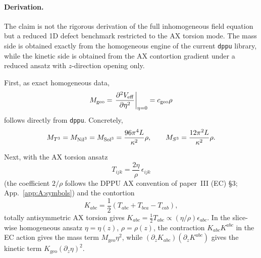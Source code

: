 \paragraph{Derivation.}
The claim is not the rigorous derivation of the full inhomogeneous field
equation but a reduced 1D defect benchmark restricted to the AX torsion mode.
The mass side is obtained exactly from the homogeneous engine of the current
\texttt{dppu} library, while the kinetic side is obtained from the AX
contortion gradient under a reduced ansatz with $z$-direction opening only.

First, as exact homogeneous data,
\begin{equation}
  M_{\mathrm{geo}} = \left.\frac{\partial^2V_{\mathrm{eff}}}{\partial\eta^2}\right|_{\eta=0}
  = c_{\mathrm{geo}}\rho
\end{equation}
follows directly from \texttt{dppu}.  Concretely,
\begin{equation}
  M_{T^3} = M_{\mathrm{Nil}^3} = M_{\mathrm{Sol}^3} = \frac{96\pi^4 L}{\kappa^2}\rho,
  \qquad
  M_{S^3} = \frac{12\pi^2 L}{\kappa^2}\rho.
\end{equation}

Next, with the AX torsion ansatz
\begin{equation}
  T_{ijk} = \frac{2\eta}{\rho}\,\epsilon_{ijk}
\end{equation}
(the coefficient $2/\rho$ follows the DPPU AX convention of paper~III (EC)
\S3; App.~\ref{app:A:symbols}) and the contortion
\begin{equation}
  K_{abc} = \frac{1}{2}(T_{abc} + T_{bca} - T_{cab}),
\end{equation}
totally antisymmetric AX torsion gives
$K_{abc} = \tfrac{1}{2}T_{abc}\propto(\eta/\rho)\epsilon_{abc}$.  In the
slice-wise homogeneous ansatz $\eta = \eta(z)$, $\rho = \rho(z)$, the
contraction $K_{abc}K^{abc}$ in the EC action gives the mass term
$M_{\mathrm{geo}}\eta^2$, while $(\partial_z K_{abc})(\partial_z K^{abc})$
gives the kinetic term $K_{\mathrm{geo}}(\partial_z\eta)^2$.

